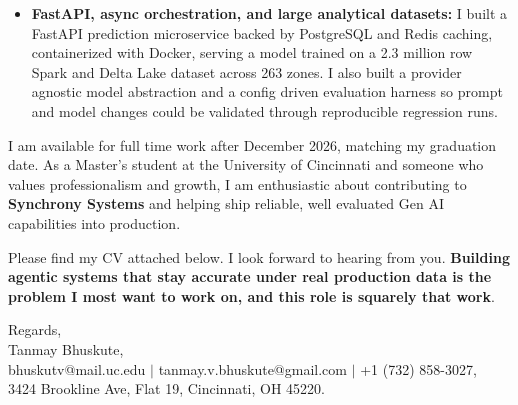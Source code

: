 \documentclass[11pt]{letter}
\begin{document}
\begin{letter}{}
\begin{itemize}[leftmargin=*, itemsep=0.45em]
    \item \textbf{FastAPI, async orchestration, and large analytical datasets:} I built a FastAPI prediction microservice backed by PostgreSQL and Redis caching, containerized with Docker, serving a model trained on a 2.3 million row Spark and Delta Lake dataset across 263 zones. I also built a provider agnostic model abstraction and a config driven evaluation harness so prompt and model changes could be validated through reproducible regression runs.
\end{itemize}

I am available for full time work after December 2026, matching my graduation date. As a Master's student at the University of Cincinnati and someone who values professionalism and growth, I am enthusiastic about contributing to \textbf{Synchrony Systems} and helping ship reliable, well evaluated Gen AI capabilities into production.

Please find my CV attached below. I look forward to hearing from you. \textbf{Building agentic systems that stay accurate under real production data is the problem I most want to work on, and this role is squarely that work}.

{\setlength{\parskip}{0pt}
Regards,\\
Tanmay Bhuskute,\\
bhuskutv@mail.uc.edu $\mid$ tanmay.v.bhuskute@gmail.com $\mid$ +1 (732) 858-3027,\\
3424 Brookline Ave, Flat 19, Cincinnati, OH 45220.
}

\end{letter}
\end{document}
